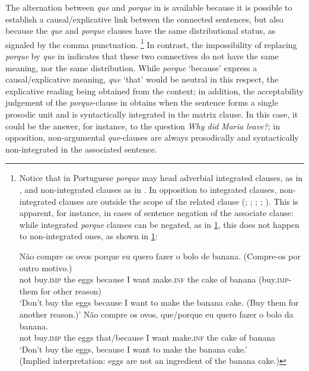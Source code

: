 \documentclass[output=paper,colorlinks,citecolor=brown,
]{langscibook}
\begin{document}
The alternation between \textit{que} and \textit{porque} in  is available because it is possible to establish a causal/explicative link between the connected sentences, but also because the \textit{que} and \textit{porque} clauses have the same distributional status, as signaled by the comma punctuation.
\footnote{Notice that in Portuguese \textit{porque} may head adverbial integrated clauses, as in , and non-integrated clauses as in . In opposition to integrated clauses, non-integrated clauses are outside the scope of the related clause (\citealt{haegeman_parenthetical_1991}; \citeyear{haegeman_adverbial_2012}; \citealt{lobo_aspectos_2003}; \citealt{matos_coordenacao_2004}; \citealt{colaco_explicative_2016}). This is apparent, for instance, in cases of sentence negation of the associate clause: while integrated \textit{porque} clauses can be negated, as in \ref{ex:matos:fn1-i}, this does not happen to non-integrated ones, as shown in \ref{ex:matos:fn1-ii}:

\ea 
 \ea\label{ex:matos:fn1-i}
 \gll Não compre os ovos porque eu quero fazer o bolo de banana. (Compre-os por outro motivo.)\\
      	 not buy.\textsc{imp} the eggs because I want make.\textsc{inf} the cake of banana (buy.\textsc{imp}-them for other reason)\\
 \glt ‘Don’t buy the eggs because I want to make the banana cake. (Buy them for another reason.)’
 \ex\label{ex:matos:fn1-ii}
 \gll Não compre os ovos, que/porque eu quero fazer o bolo da banana.\\
      	  not buy.\textsc{imp} the eggs that/because I want make.\textsc{inf} the cake of banana\\
      	\glt ‘Don’t buy the eggs, because I want to make the banana cake.’\\
     	 (Implied interpretation: eggs are not an ingredient of the banana cake.) 
\z
\z} 
In contrast, the impossibility of replacing \textit{porque} by \textit{que} in  indicates that these two connectives do not have the same meaning, nor the same distribution. While \textit{porque} ‘because’ express a causal/explicative meaning, \textit{que} ‘that’ would be neutral in this respect, the explicative reading being obtained from the context; in addition, the acceptability judgement of the \textit{porque}-clause in  obtains when the sentence forms a single prosodic unit and is syntactically integrated  in the matrix clause. In this case, it could be the answer, for instance, to the question \textit{Why did Maria leave?}; in opposition, non-argumental \textit{que}-clauses are always prosodically and syntactically non-integrated in the associated sentence.
\end{document}
